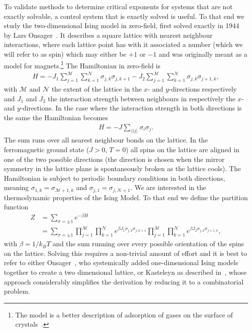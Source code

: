 \documentclass[11pt, a4paper]{report} %
\begin{document}
To validate methods to determine critical exponents for systems that are not exactly solvable, a control system that is exactly solved is useful. To that end we study the two-dimensional Ising model in zero-field, first solved exactly in 1944 by Lars Onsager~\cite{onsager:1944}.
It describes a square lattice with nearest neighbour interactions, where each lattice point has with it associated a number (which we will refer to as spin) which may either be \(+1\) or \(-1\) and was originally meant as a model for magnets.\footnote{The model is a better description of adsorption of gases on the surface of crystals~\cite{onsager:1944}.}
The Hamiltonian in zero-field is~\cite{mccoy:1973}
\begin{align}
	H = -J_{1} \sum_{j=1}^{\mathcal{M}} \sum_{k=1}^{\mathcal{N}} \sigma_{j,k} \sigma_{j,k+1} - J_{2} \sum_{j=1}^{\mathcal{M}} \sum_{k=1}^{\mathcal{N}} \sigma_{j,k} \sigma_{j+1,k},
\end{align}
with \(\mathcal{M}\) and \(\mathcal{N}\) the extent of the lattice in the \(x\)- and \(y\)-directions respectively and \(J_{1}\) and \(J_{2}\) the interaction strength between neighbours in respectively the \(x\)- and \(y\)-directions.
In the case where the interaction strength in both directions is the same the Hamiltonian becomes~\cite{newman:1999}
\begin{align}
	\label{eq:isotropic_Hamiltonian}
	H = -J \sum_{\langle ij \rangle} \sigma_{i} \sigma_{j}.
\end{align}
The sum runs over all nearest neighbour bonds on the lattice.
In the ferromagnetic ground state (\(J>0\), \(T=0\)) all spins on the lattice are aligned in one of the two possible directions (the direction is chosen when the mirror symmetry in the lattice plane is spontaneously broken as the lattice cools).
The Hamiltonian is subject to periodic boundary conditions in both directions, meaning \(\sigma_{1,k} = \sigma_{\mathcal{M}+1,k}\) and \(\sigma_{j,1} = \sigma_{j,\mathcal{N}+1}\).
We are interested in the thermodynamic properties of the Ising Model.
To that end we define the partition function
\begin{align}
	Z &= \sum_{\sigma = \pm 1} e^{-\beta H} \\
	  &= \sum_{\sigma = \pm 1} \prod_{j=1}^{\mathcal{M}} \prod_{k=1}^{\mathcal{N}} e^{\beta J_1 \sigma_{j,k} \sigma_{j,k+1}} \prod_{j=1}^{\mathcal{M}} \prod_{k=1}^{\mathcal{N}} e^{\beta J_2 \sigma_{j,k} \sigma_{j+1,k}},
\end{align}
with \(\beta=1/k_B T\) and the sum running over every possible orientation of the spins on the lattice. Solving this requires a non-trivial amount of effort and it is best to refer to either Onsager~\cite{onsager:1944}, who systemically added one-dimensional Ising models together to create a two dimensional lattice, or Kasteleyn as described in~\cite{mccoy:1973}, whose approach considerably simplifies the derivation by reducing it to a combinatorial problem.
\end{document}

